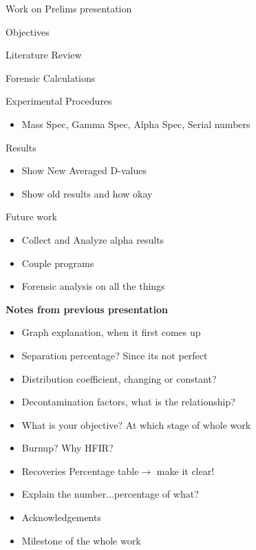 \documentclass[idxtotoc,hyperref,openany,oneside]{labbook} %
\newcommand{\cmark}{\ding{51}}%
\newcommand{\done}{\rlap{$\square$}{\raisebox{2pt}{\large\hspace{1pt}\cmark}}%
  \hspace{-2.5pt}}
\begin{document}
\begin{todolist}
\item{Work on Prelims presentation}
  \begin{todolist}
  \item[\done]{Objectives}
  \item[\done]{Literature Review}
  \item{Forensic Calculations}
  \item{Experimental Procedures}
    \begin{itemize}
    \item{Mass Spec, Gamma Spec, Alpha Spec, Serial numbers}
    \end{itemize}
  \item{Results}
    \begin{itemize}
    \item{Show New Averaged D-values}
    \item{Show old results and how okay}
    \end{itemize}
  \item[\done]{Future work}
    \begin{itemize}
    \item{Collect and Analyze alpha results}
    \item{Couple programs}
    \item{Forensic analysis on all the things}
    \end{itemize}
  \end{todolist}
\end{todolist}

\textbf{Notes from previous presentation}
\begin{itemize}
\item{Graph explanation, when it first comes up}
\item{Separation percentage? Since its not perfect}
\item{Distribution coefficient, changing or constant?}
\item{Decontamination factors, what is the relationship?}
\item{What is your objective? At which stage of whole work}
\item{Burnup? Why HFIR?}
\item{Recoveries Percentage table$\rightarrow$ make it clear!}
\item{Explain the number...percentage of what?}
\item{Acknowledgements}
\item{Milestone of the whole work}
\end{itemize}
\end{document}
